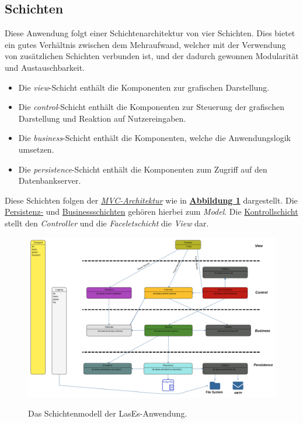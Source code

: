 
\subsection{Schichten}\label{arch:schichten}
Diese Anwendung folgt einer Schichtenarchitektur von vier Schichten. Dies bietet ein gutes Verhältnis zwischen dem Mehraufwand,
welcher mit der Verwendung von zusätzlichen Schichten verbunden ist, und der dadurch gewonnen Modularität und Austauschbarkeit.
\begin{itemize}
    \item Die \emph{view}-Schicht enthält die Komponenten zur grafischen Darstellung.
    \item Die \emph{control}-Schicht enthält die Komponenten zur Steuerung der grafischen Darstellung und Reaktion auf
    Nutzereingaben.
    \item Die \emph{business}-Schicht enthält die Komponenten, welche die Anwendungslogik umsetzen.
    \item Die \emph{persistence}-Schicht enthält die Komponenten zum Zugriff auf den Datenbankserver.
\end{itemize}
Diese Schichten folgen der \emph{\hyperref[arch:mvc]{MVC-Architektur}} wie in \textbf{\hyperref[arch:pakdia]{Abbildung 1}} dargestellt.
Die \hyperref[arch:persistence]{Persistenz-} und \hyperref[arch:business]{Businessschichten} gehören hierbei
zum \emph{Model}. Die \hyperref[arch:control]{Kontrollschicht} stellt den \emph{Controller} und die
\emph{Faceletschicht} %
die \emph{View} dar.

\begin{figure}[H]
\centering
    \includegraphics[width=0.8\linewidth]{graphics/Paketdiagramm9.0}\label{arch:pakdia}
    \caption{Das Schichtenmodell der LasEs-Anwendung.}
\end{figure}


